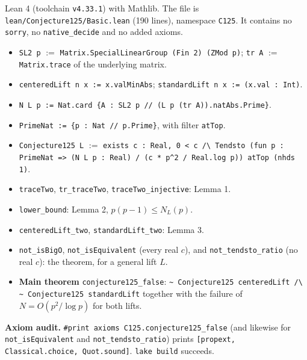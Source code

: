 \documentclass[11pt]{article}
\theoremstyle{definition}
\begin{document}
Lean 4 (toolchain \texttt{v4.33.1}) with Mathlib. The file is \texttt{lean/Conjecture125/Basic.lean}
(190 lines), namespace \texttt{C125}. It contains no \texttt{sorry}, no \texttt{native\_decide} and no
added axioms.

\begin{itemize}
\item \texttt{SL2 p} $:=$ \texttt{Matrix.SpecialLinearGroup (Fin 2) (ZMod p)};
  \texttt{tr A} $:=$ \texttt{Matrix.trace} of the underlying matrix.
\item \texttt{centeredLift n x := x.valMinAbs}; \texttt{standardLift n x := (x.val : Int)}.
\item \texttt{N L p := Nat.card \{A : SL2 p // (L p (tr A)).natAbs.Prime\}}.
\item \texttt{PrimeNat := \{p : Nat // p.Prime\}}, with filter \texttt{atTop}.
\item \texttt{Conjecture125 L} $:=$ \texttt{exists c : Real, 0 < c /\textbackslash{} Tendsto (fun p : PrimeNat => (N L p : Real) / (c * p\^{}2 / Real.log p)) atTop (nhds 1)}.
\item \texttt{traceTwo}, \texttt{tr\_traceTwo}, \texttt{traceTwo\_injective}: Lemma 1.
\item \texttt{lower\_bound}: Lemma 2, $p(p-1)\le N_L(p)$.
\item \texttt{centeredLift\_two}, \texttt{standardLift\_two}: Lemma 3.
\item \texttt{not\_isBigO}, \texttt{not\_isEquivalent} (every real $c$), and
  \texttt{not\_tendsto\_ratio} (no real $c$): the theorem, for a general lift $L$.
\item \textbf{Main theorem} \texttt{conjecture125\_false}:
  \texttt{\textasciitilde{} Conjecture125 centeredLift /\textbackslash{} \textasciitilde{} Conjecture125 standardLift}
  together with the failure of $N=O(p^2/\log p)$ for both lifts.
\end{itemize}

\textbf{Axiom audit.} \texttt{\#print axioms C125.conjecture125\_false} (and likewise for
\texttt{not\_isEquivalent} and \texttt{not\_tendsto\_ratio}) prints
\texttt{[propext, Classical.choice, Quot.sound]}. \texttt{lake build} succeeds.
\end{document}
